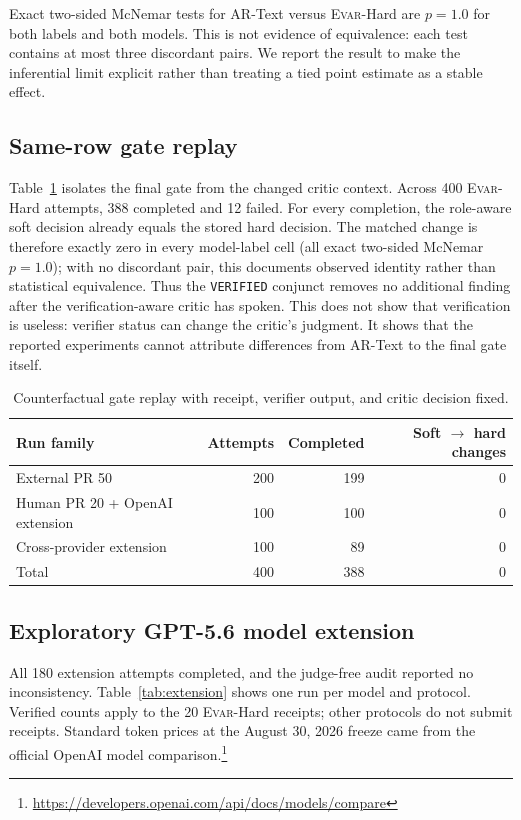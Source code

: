 \documentclass[acmsmall,screen,review,anonymous]{acmart}
\newcommand{\evar}{\textsc{Evar}\xspace}
\begin{document}
Exact two-sided McNemar tests for AR-Text versus \evar-Hard are $p=1.0$ for both labels and both models. This is not evidence of equivalence: each test contains at most three discordant pairs. We report the result to make the inferential limit explicit rather than treating a tied point estimate as a stable effect.

\subsection{Same-row gate replay}

Table~\ref{tab:gate-replay} isolates the final gate from the changed critic context. Across 400 \evar-Hard attempts, 388 completed and 12 failed. For every completion, the role-aware soft decision already equals the stored hard decision. The matched change is therefore exactly zero in every model-label cell (all exact two-sided McNemar $p=1.0$); with no discordant pair, this documents observed identity rather than statistical equivalence. Thus the \texttt{VERIFIED} conjunct removes no additional finding after the verification-aware critic has spoken. This does not show that verification is useless: verifier status can change the critic's judgment. It shows that the reported experiments cannot attribute differences from AR-Text to the final gate itself.

\begin{table}[h]
\centering
\caption{Counterfactual gate replay with receipt, verifier output, and critic decision fixed.}
\label{tab:gate-replay}
\small
\begin{tabular}{@{}lrrr@{}}
\toprule
Run family & Attempts & Completed & Soft $\rightarrow$ hard changes \\
\midrule
External PR 50 & 200 & 199 & 0 \\
Human PR 20 + OpenAI extension & 100 & 100 & 0 \\
Cross-provider extension & 100 & 89 & 0 \\
\midrule
Total & 400 & 388 & 0 \\
\bottomrule
\end{tabular}
\end{table}

\subsection{Exploratory GPT-5.6 model extension}

All 180 extension attempts completed, and the judge-free audit reported no inconsistency. Table~\ref{tab:extension} shows one run per model and protocol. Verified counts apply to the 20 \evar-Hard receipts; other protocols do not submit receipts. Standard token prices at the August 30, 2026 freeze came from the official OpenAI model comparison.\footnote{\url{https://developers.openai.com/api/docs/models/compare}}
\end{document}
